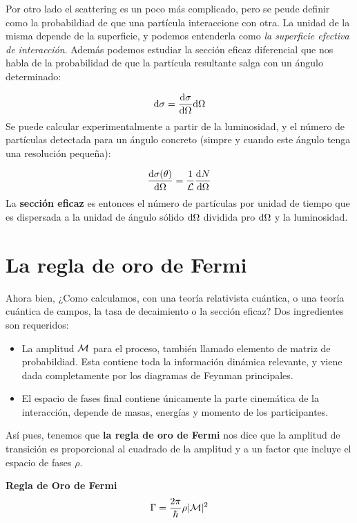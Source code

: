 Por otro lado el scattering es un poco más complicado, pero se peude definir como la probabildiad de que una partícula interaccione con otra. La unidad de la misma depende de la superficie, y podemos entenderla como \textit{la superficie efectiva de interacción}. Además podemos estudiar la sección eficaz diferencial que nos habla de la probabilidad de que la partícula resultante salga con un ángulo determinado: 

\begin{equation}
    \mathrm{d} \sigma = \frac{\mathrm{d} \sigma}{\mathrm{d} \Omega} \mathrm{d} \Omega
\end{equation}
Se puede calcular experimentalmente a partir de la luminosidad, y el número de partículas detectada para un ángulo concreto (simpre y cuando este ángulo tenga una resolución pequeña):

\begin{equation*}
    \dv{\sigma (\theta)}{\Omega} = \frac{1}{\mathcal{L}} \frac{\mathrm{d} N}{\mathrm{d} \Omega} 
\end{equation*}
La \textbf{sección eficaz} es entonces el número de partículas por unidad de tiempo que es dispersada  a la unidad de ángulo sólido $\mathrm{d} \Omega$ dividida pro $\mathrm{d} \Omega$ y la luminosidad. 

\section{La regla de oro de Fermi}

Ahora bien, ¿Como calculamos, con una teoría relativista cuántica, o una teoría cuántica de campos, la tasa de decaimiento o la sección eficaz? Dos ingredientes son requeridos:

\begin{itemize}
    \item La amplitud $\mathcal{M}$ para el proceso, también llamado elemento de matriz de probabildiad. Esta contiene toda la información dinámica relevante, y viene dada completamente por los diagramas de Feynman principales. 
    \item El espacio de fases final contiene únicamente la parte cinemática de la interacción, depende de masas, energías y momento de los participantes. 
\end{itemize}
Así pues, tenemos que \textbf{la regla de oro de Fermi} nos dice que la amplitud de transición es proporcional al cuadrado de la amplitud y a un factor que incluye el espacio de fases  $ \rho $.

\begin{Resaltar}
    \textbf{Regla de Oro de Fermi}
    \begin{equation*}
        \Gamma = \frac{2\pi}{\hbar}   \rho  |\mathcal{M} |^2
    \end{equation*}
\end{Resaltar}

